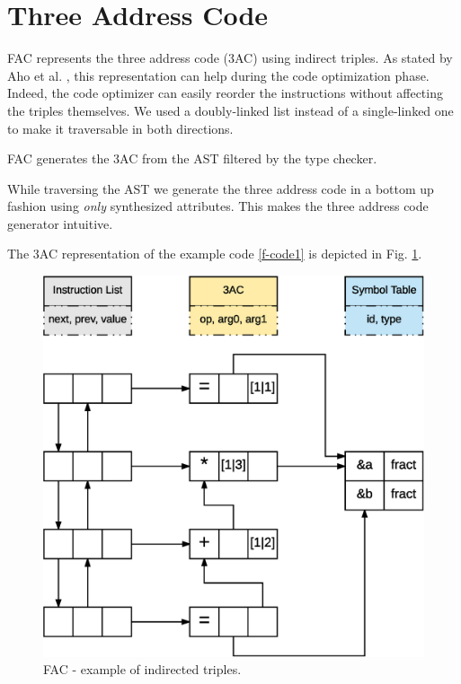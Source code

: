 \section{Three Address Code}
FAC represents the three address code (3AC) using indirect triples. 
As stated by Aho et al. \cite{dragonbook}, this 
representation can help during the code optimization phase.
Indeed, the code optimizer can easily reorder the instructions without affecting
the triples themselves. We used a doubly-linked list instead of a single-linked
one to make it traversable in both directions.

FAC generates the 3AC from the AST filtered by the type checker. 

While traversing the AST we generate the three address code in a bottom up
fashion using \emph{only} synthesized attributes. This makes the three address
code generator intuitive.

The 3AC representation of the example code \ref{f-code1} is depicted in 
Fig. \ref{fig:ind-trpl}.

\begin{figure}[H]
  \centering
  \includegraphics[width=.9\columnwidth]{img/eps/indirect_triples.eps}
  \caption{FAC - example of indirected triples.}
  \label{fig:ind-trpl}
\end{figure}
